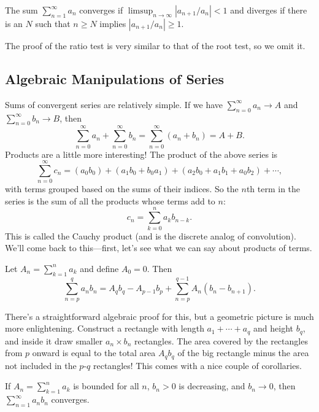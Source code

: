 \documentclass[../m131main.tex]{subfiles}
\begin{document}
\begin{theorem}
    The sum $\sum_{n=1}^{\infty} a_n$ converges if $\limsup_{n \to \infty} |a_{n+1} / a_n| < 1$ and diverges if there is an $N$ such that $n \geq N$ implies $|a_{n+1} / a_n| \geq 1$.
\end{theorem}

The proof of the ratio test is very similar to that of the root test, so we omit it.

\subsection*{Algebraic Manipulations of Series}
Sums of convergent series are relatively simple.
If we have $\sum_{n=0}^{\infty} a_n \to A$ and $\sum_{n=0}^{\infty} b_n \to B$, then
\[ \sum_{n=0}^{\infty} a_n + \sum_{n=0}^{\infty} b_n = \sum_{n=0}^{\infty} (a_n + b_n) = A + B. \]
Products are a little more interesting!
The product of the above series is
\[ \sum_{n=0}^{\infty} c_n = (a_0b_0) + (a_1b_0 + b_0a_1) + (a_2b_0 + a_1b_1 + a_0b_2) + \cdots, \]
with terms grouped based on the sums of their indices.
So the $n$th term in the series is the sum of all the products whose terms add to $n$:
\[ c_n = \sum_{k=0}^{n} a_k b_{n-k}. \]
This is called the Cauchy product (and is the discrete analog of convolution).
We'll come back to this---first, let's see what we can say about products of terms.

\pagebreak

\begin{theorem}
    Let $A_n = \sum_{k=1}^{n} a_k$ and define $A_0 = 0$.
    Then
    \[ \sum_{n=p}^{q} a_n b_n = A_qb_q - A_{p-1}b_p + \sum_{n=p}^{q-1} A_n (b_n - b_{n+1}). \]
\end{theorem}

There's a straightforward algebraic proof for this, but a geometric picture is much more enlightening.
Construct a rectangle with length $a_1 + \cdots + a_q$ and height $b_q$, and inside it draw smaller $a_n \times b_n$ rectangles.
The area covered by the rectangles from $p$ onward is equal to the total area $A_q b_q$ of the big rectangle minus the area not included in the $p$-$q$ rectangles!
This comes with a nice couple of corollaries.

\begin{theorem}[]
    If $A_n = \sum_{k=1}^{n} a_k$ is bounded for all $n$, $b_n > 0$ is decreasing, and $b_n \to 0$, then $\sum_{n=1}^{\infty} a_n b_n$ converges.
\end{theorem}
\end{document}
